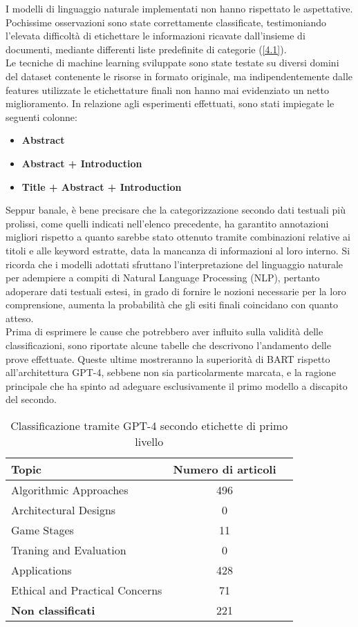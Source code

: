 I modelli di linguaggio naturale implementati non hanno rispettato le aspettative. Pochissime osservazioni sono state correttamente classificate, testimoniando l'elevata difficoltà di etichettare le informazioni ricavate dall'insieme di documenti, mediante differenti liste predefinite di categorie (\ref{4.1}). \vspace{7pt} \\
Le tecniche di machine learning sviluppate sono state testate su diversi domini del dataset contenente le risorse in formato originale, ma indipendentemente dalle features utilizzate le etichettature finali non hanno mai evidenziato un netto miglioramento. In relazione agli esperimenti effettuati, sono stati impiegate le seguenti colonne:
\begin{itemize}
    \renewcommand{\labelitemi}{-}
    \item \textbf{Abstract}
    \item \textbf{Abstract + Introduction}
    \item \textbf{Title + Abstract + Introduction}
\end{itemize}
Seppur banale, è bene precisare che la categorizzazione secondo dati testuali più prolissi, come quelli indicati nell'elenco precedente, ha garantito annotazioni migliori rispetto a quanto sarebbe stato ottenuto tramite combinazioni relative ai titoli e alle keyword estratte, data la mancanza di informazioni al loro interno. Si ricorda che i modelli adottati sfruttano l'interpretazione del linguaggio naturale per adempiere a compiti di Natural Language Processing (NLP), pertanto adoperare dati testuali estesi, in grado di fornire le nozioni necessarie per la loro comprensione, aumenta la probabilità che gli esiti finali coincidano con quanto atteso. \vspace{7pt} \\
Prima di esprimere le cause che potrebbero aver influito sulla validità delle classificazioni, sono riportate alcune tabelle che descrivono l'andamento delle prove effettuate. Queste ultime mostreranno la superiorità di BART rispetto all'architettura GPT-4, sebbene non sia particolarmente marcata, e la ragione principale che ha spinto ad adeguare esclusivamente il primo modello a discapito del secondo.  
\begin{table}[H]
    \centering
    \begin{tabular}{l|cc|}
        \hline
        \textbf{Topic} & \textbf{Numero di articoli} \\
        \hline
        Algorithmic Approaches & 496 \\
        Architectural Designs & 0 \\
        Game Stages & 11 \\
        Traning and Evaluation & 0 \\
        Applications & 428 \\
        Ethical and Practical Concerns & 71 \\
        \hline
        \textbf{Non classificati} & 221 \\
    \end{tabular}
    \caption{Classificazione tramite GPT-4 secondo etichette di primo livello}
\end{table}
